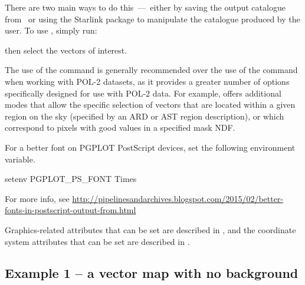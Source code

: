 There are two main ways to do this\ ---\ either by saving the output
catalogue from \ or using the Starlink package
 to manipulate
the catalogue produced by the user.  To use \polpack, simply run:

\begin{terminalv}
\end{terminalv}

then select the vectors of interest.

\begin{terminalv}
\end{terminalv}

The use of the   command is
generally recommended over the use of the  
command when working with POL-2 datasets, as it provides a greater number of options
specifically designed for use with POL-2 data. For example,  offers
additional modes that allow the specific selection of vectors that are located within a given
region on the sky (specified by an ARD or AST region description), or which correspond to
pixels with good values in a specified mask NDF. 


\begin{tip}
  For a better font on PGPLOT PostScript devices, set the following
  environment variable.

\begin{terminalv}
setenv PGPLOT_PS_FONT Times
\end{terminalv}

For more info, see
\url{http://pipelinesandarchives.blogspot.com/2015/02/better-fonts-in-postscript-output-from.html}

Graphics-related attributes that can be set are described in
, and the coordinate system attributes that can be set are
described in .
\end{tip}





\subsection{ Example 1 -- a vector map with no background}
\label{section:kappa-example1}

